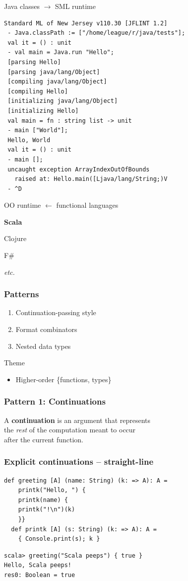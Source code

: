 \documentclass[14pt,t,usepdftitle=false,
xcolornames=x11names,svgnames,dvipsnames]{beamer}
\newcommand{\slideheading}[1]{
  \begin{center}
    \usebeamerfont{frametitle}
    \usebeamercolor[fg]{frametitle}#1
  \end{center}\vskip-5mm}
\begin{document}
\begin{frame}[fragile]{Java classes $\to$ SML runtime}
\begin{lstlisting}[style=smlrepl,basicstyle={\footnotesize\ttfamily}]
 Standard ML of New Jersey v110.30 [JFLINT 1.2]
 - Java.classPath := ["/home/league/r/java/tests"];
 val it = () : unit
 - val main = Java.run "Hello";
 [parsing Hello]
 [parsing java/lang/Object]
 [compiling java/lang/Object]
 [compiling Hello]
 [initializing java/lang/Object]
 [initializing Hello]
 val main = fn : string list -> unit
 - main ["World"];
 Hello, World
 val it = () : unit
 - main [];
 uncaught exception ArrayIndexOutOfBounds
   raised at: Hello.main([Ljava/lang/String;)V
 - ^D
\end{lstlisting}
\end{frame}

\begin{frame}{OO runtime $\leftarrow$ functional languages}
  \begin{center}\large
    \textbf{Scala}\bigskip

    Clojure\bigskip

    F\#\bigskip

    \textit{etc.}
  \end{center}
\end{frame}
\begin{frame}
    \frametitle{Patterns}
    \begin{enumerate}
    \item Continuation-passing style
    \item Format combinators
    \item Nested data types
    \end{enumerate}
  \slideheading{Theme}
    \begin{itemize}
    \item Higher-order \{functions, types\}
    \end{itemize}
\end{frame}

\begin{frame}
  \frametitle{Pattern 1: Continuations}
  A \textbf{continuation} is an argument that represents\\ the
  \emph{rest} of the computation meant to occur\\after the current
  function.
\end{frame}

\begin{frame}[fragile]
  \frametitle{Explicit continuations -- straight-line}
\begin{lstlisting}[style=scala,moreemph={A}]
  def greeting [A] (name: String) (k: => A): A =
    printk("Hello, ") {
    printk(name) {
    printk("!\n")(k)
    }}
  def printk [A] (s: String) (k: => A): A =
    { Console.print(s); k }
\end{lstlisting}
\begin{lstlisting}[style=scalarepl]
scala> greeting("Scala peeps") { true }
Hello, Scala peeps!
res0: Boolean = true
\end{lstlisting}
\end{frame}
\end{document}
